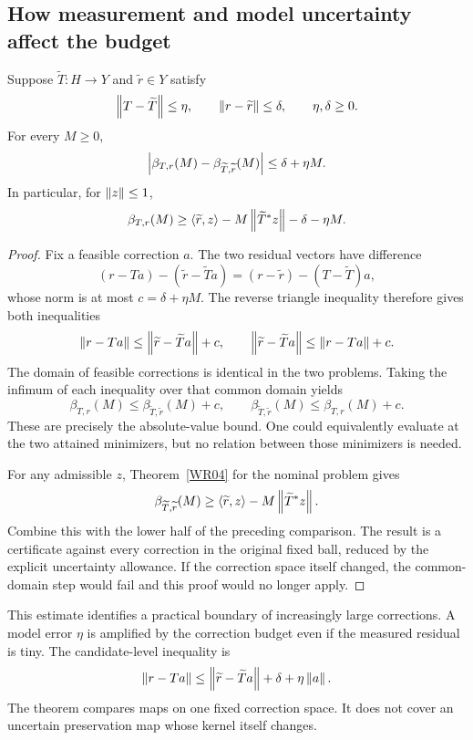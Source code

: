 \subsection{How measurement and model uncertainty affect the budget}
\begin{theorem}\label{WR05}
Suppose $\widetilde T:H\to Y$ and $\widetilde r\in Y$ satisfy
\[
 \left\lVert T-\widetilde T\right\rVert\le\eta,\qquad
 \left\lVert r-\widetilde r\right\rVert\le\delta,\qquad\eta,\delta\ge0.
\]
For every $M\ge0$,
\[
 \left\lvert\beta_{T,r}(M)-\beta_{\widetilde T,\widetilde r}(M)\right\rvert
 \le\delta+\eta M.
\]
In particular, for $\left\lVert z\right\rVert\le1$,
\[
 \beta_{T,r}(M)\ge
 \langle\widetilde r,z\rangle-M\left\lVert\widetilde T^*z\right\rVert
       -\delta-\eta M.
\]
\end{theorem}
\begin{proof}
Fix a feasible correction $a$. The two residual vectors have difference
\[
 (r-Ta)-(\widetilde r-\widetilde Ta)
 =(r-\widetilde r)-(T-\widetilde T)a,
\]
whose norm is at most $c=\delta+\eta M$. The reverse triangle inequality therefore gives both inequalities
\[
 \left\lVert r-Ta\right\rVert\le\left\lVert\widetilde r-\widetilde Ta\right\rVert+c,
 \qquad
 \left\lVert\widetilde r-\widetilde Ta\right\rVert\le\left\lVert r-Ta\right\rVert+c.
\]
The domain of feasible corrections is identical in the two problems. Taking the infimum of each inequality over that common domain yields
\[
 \beta_{T,r}(M)\le\beta_{\widetilde T,\widetilde r}(M)+c,
 \qquad
 \beta_{\widetilde T,\widetilde r}(M)\le\beta_{T,r}(M)+c.
\]
These are precisely the absolute-value bound. One could equivalently evaluate at the two attained minimizers, but no relation between those minimizers is needed.

For any admissible $z$, Theorem~\ref{WR04} for the nominal problem gives
\[
 \beta_{\widetilde T,\widetilde r}(M)
 \ge\langle\widetilde r,z\rangle-M\left\lVert\widetilde T^*z\right\rVert.
\]
Combine this with the lower half of the preceding comparison. The result is a certificate against every correction in the original fixed ball, reduced by the explicit uncertainty allowance. If the correction space itself changed, the common-domain step would fail and this proof would no longer apply.
\end{proof}

This estimate identifies a practical boundary of increasingly large corrections. A model error $\eta$ is amplified by the correction budget even if the measured residual is tiny. The candidate-level inequality is
\[
 \left\lVert r-Ta\right\rVert\le\left\lVert\widetilde r-\widetilde Ta\right\rVert+\delta+\eta\left\lVert a\right\rVert.
\]
The theorem compares maps on one fixed correction space. It does not cover an uncertain preservation map whose kernel itself changes.

